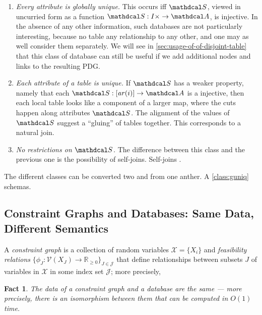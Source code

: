 \documentclass{article}
\theoremstyle{plain}
\newtheorem{fact}[theorem]{Fact}
\theoremstyle{definition}
\theoremstyle{remark}
\newcommand{\Attrs}{\mathdcal A}
\newcommand{\sch}{\mathdcal S}%
\newcommand{\arity}{\mathit{ar}}
\newcommand{\V}{\mathcal V}
\begin{document}
\begin{enumerate}[nosep, label={\textbf{Class \arabic*:}},ref={class \arabic*}]

	\item %
		\textit{Every attribute is globally unique.}
		This occurs iff $\sch$, viewed in uncurried form as a function $\sch : I \times \to \Attrs$, is injective. 
		In the absence of any other information, such databases are not particularly interesting, because no table any relationship to any other, and one may as well consider them separately. We will see in \cref{sec:usage-of-of-disjoint-table} that this class of database can still be useful if we add additional nodes and links to the resulting PDG.
		\label{class:guniq}
				
	\item %
		\textit{Each attribute of a table is unique.}
		If $\sch$ has a weaker property, namely that each $\sch : [\arity(i)] \to \Attrs$ is a injective, then each local table looks like a component of a larger map, where the cuts happen along attributes $\sch$. The alignment of the values of $\sch$ suggest a ``gluing'' of tables together. This corresponds to a natural join. 
		\label{class:luniq}
	\item \textit{No restrictions on $\sch$.} The difference between this class and the previous one is the possibility of self-joins. Self-joins \cite{DS04}.
		\label{class:nuniq}
\end{enumerate}

	The different classes can be converted two and from one anther. A \ref{class:guniq} schemas.
	
\subsection{Constraint Graphs and Databases: Same Data, Different Semantics}
\begin{defn}
	A \emph{constraint graph}  is a collection of random variables
	$\mathcal X = \{X_i\}$ and  \emph{feasibility relations}
	$\{\phi_J\colon \V(X_J) \to \mathbb R_{\geq0}\}_{J \in
		\mathcal J }$
	that define relationships between subsets $J$ of variables in
	$\mathcal X$ in some index set $\mathcal J$;
	more precisely,
\end{defn}
\begin{fact}
	The data of a constraint graph and a database are the same --- more precisely, there is an isomorphism between them that can be computed in $O(1)$ time.
\end{fact}
\end{document}
